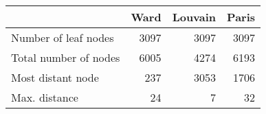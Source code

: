 \begin{tabular}{lrrr}
\toprule
{} &  Ward &  Louvain &  Paris \\
\midrule
Number of leaf nodes  &  3097 &     3097 &   3097 \\
Total number of nodes &  6005 &     4274 &   6193 \\
Most distant node     &   237 &     3053 &   1706 \\
Max. distance         &    24 &        7 &     32 \\
\bottomrule
\end{tabular}
